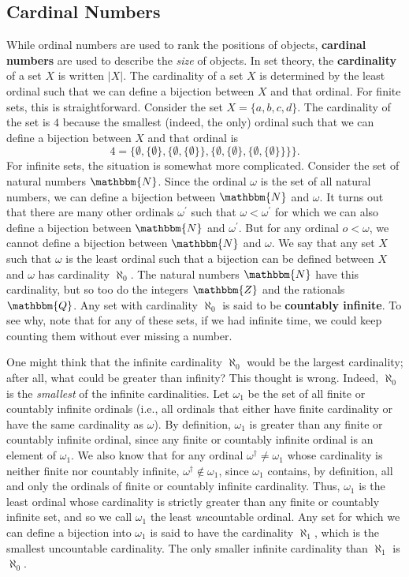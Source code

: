 \documentclass[11pt]{article}
\theoremstyle{definition}
\theoremstyle{remark}
\begin{document}
\subsection{Cardinal Numbers}
While ordinal numbers are used to rank the positions of objects, \textbf{cardinal numbers} are used to describe the \textit{size} of objects. In set theory, the \textbf{cardinality} of a set $X$ is written $|X|$. The cardinality of a set $X$ is determined by the least ordinal such that we can define a bijection between $X$ and that ordinal. For finite sets, this is straightforward. Consider the set $X=\{a,b,c,d\}$. The cardinality of the set is $4$ because the smallest (indeed, the only) ordinal such that we can define a bijection between $X$ and that ordinal is $$4=\{\emptyset,\{\emptyset\},\{\emptyset,\{\emptyset\}\},\{\emptyset,\{\emptyset\},\{\emptyset,\{\emptyset\}\}\}\}.$$
For infinite sets, the situation is somewhat more complicated. Consider the set of natural numbers $\mathbbm{N}$. Since the ordinal $\omega$ is the set of all natural numbers, we can define a bijection between $\mathbbm{N}$ and $\omega$. It turns out that there are many other ordinals $\omega^{\prime}$ such that $\omega<\omega^{\prime}$ for which we can also define a bijection between $\mathbbm{N}$ and $\omega^{\prime}$. But for any ordinal $o<\omega$, we cannot define a bijection between $\mathbbm{N}$ and $\omega$. We say that any set $X$ such that $\omega$ is the least ordinal such that a bijection can be defined between $X$ and $\omega$ has cardinality $\aleph_{0}$. The natural numbers $\mathbbm{N}$ have this cardinality, but so too do the integers $\mathbbm{Z}$ and the rationals $\mathbbm{Q}$. Any set with cardinality $\aleph_{0}$ is said to be \textbf{countably infinite}. To see why, note that for any of these sets, if we had infinite time, we could keep counting them without ever missing a number.\par 

One might think that the infinite cardinality $\aleph_{0}$ would be the largest cardinality; after all, what could be greater than infinity? This thought is wrong. Indeed, $\aleph_{0}$ is the \textit{smallest} of the infinite cardinalities. Let $\omega_{1}$ be the set of all finite or countably infinite ordinals (i.e., all ordinals that either have finite cardinality or have the same cardinality as $\omega$). By definition, $\omega_{1}$ is greater than any finite or countably infinite ordinal, since any finite or countably infinite ordinal is an element of $\omega_{1}$. We also know that for any ordinal $\omega^{\dagger}\neq\omega_{1}$ whose cardinality is neither finite nor countably infinite, $\omega^{\dagger}\not\in\omega_{1}$, since $\omega_{1}$ contains, by definition, all and only the ordinals of finite or countably infinite cardinality. Thus, $\omega_{1}$ is the least ordinal whose cardinality is strictly greater than any finite or countably infinite set, and so we call $\omega_{1}$ the least \textit{un}countable ordinal. Any set for which we can define a bijection into $\omega_{1}$ is said to have the cardinality $\aleph_{1}$, which is the smallest uncountable cardinality. The only smaller infinite cardinality than $\aleph_{1}$ is $\aleph_{0}$.\par
\end{document}
